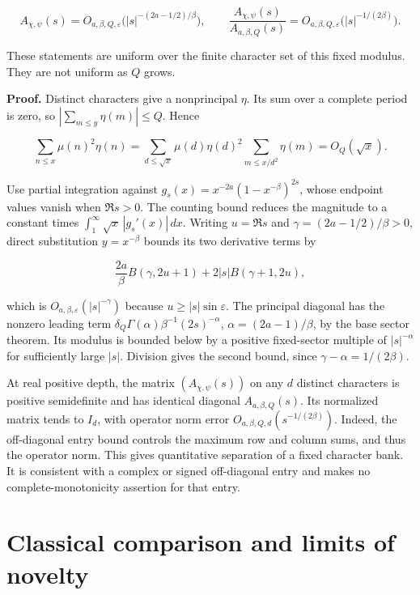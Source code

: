 \[
 A_{\chi,\psi}(s)
 =O_{a,\beta,Q,\varepsilon}\bigl(|s|^{-(2a-1/2)/\beta}\bigr),
 \qquad
 \frac{A_{\chi,\psi}(s)}{A_{a,\beta,Q}(s)}
 =O_{a,\beta,Q,\varepsilon}\bigl(|s|^{-1/(2\beta)}\bigr).
\]

These statements are uniform over the finite character set of this fixed
modulus. They are not uniform as \(Q\) grows.

\textbf{Proof.} Distinct characters give a nonprincipal \(\eta\). Its
sum over a complete period is zero, so \(|\sum_{m\le y}\eta(m)|\le Q\).
Hence

\[
 \sum_{n\le x}\mu(n)^2\eta(n)
 =\sum_{d\le\sqrt x}\mu(d)\eta(d)^2
     \sum_{m\le x/d^2}\eta(m)=O_Q(\sqrt x).
\]

Use partial integration against \(g_s(x)=x^{-2a}(1-x^{-\beta})^{2s}\),
whose endpoint values vanish when \(\Re s>0\). The counting bound
reduces the magnitude to a constant times
\(\int_1^\infty\sqrt x\,|g_s'(x)|\,dx\). Writing \(u=\Re s\) and
\(\gamma=(2a-1/2)/\beta>0\), direct substitution \(y=x^{-\beta}\) bounds
its two derivative terms by

\[
 \frac{2a}{\beta}B(\gamma,2u+1)
 +2|s|B(\gamma+1,2u),
\]

which is \(O_{a,\beta,\varepsilon}(|s|^{-\gamma})\) because
\(u\ge |s|\sin\varepsilon\). The principal diagonal has the nonzero
leading term \(\delta_Q\Gamma(\alpha)\beta^{-1}(2s)^{-\alpha}\),
\(\alpha=(2a-1)/\beta\), by the base sector theorem. Its modulus is
bounded below by a positive fixed-sector multiple of \(|s|^{-\alpha}\)
for sufficiently large \(|s|\). Division gives the second bound, since
\(\gamma-\alpha=1/(2\beta)\).

At real positive depth, the matrix \((A_{\chi,\psi}(s))\) on any \(d\)
distinct characters is positive semidefinite and has identical diagonal
\(A_{a,\beta,Q}(s)\). Its normalized matrix tends to \(I_d\), with
operator norm error \(O_{a,\beta,Q,d}(s^{-1/(2\beta)})\). Indeed, the
off-diagonal entry bound controls the maximum row and column sums, and
thus the operator norm. This gives quantitative separation of a fixed
character bank. It is consistent with a complex or signed off-diagonal
entry and makes no complete-monotonicity assertion for that entry.

\hypertarget{classical-comparison-and-limits-of-novelty}{%
\section{Classical comparison and limits of
novelty}\label{classical-comparison-and-limits-of-novelty}}

